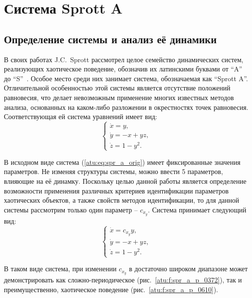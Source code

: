 
\FloatBarrier
\section{Система Sprott A}


\subsection{Определение системы и анализ её динамики} %

В своих работах J.C.~Sprott рассмотрел целое семейство динамических
систем, реализующих хаотическое поведение, обозначив их латинскими буквами
от ``A'' до ``S''~\cite{sprott_212,sprott_strange_attr}. Особое место среди них
занимает система, обозначаемая как ``Sprott A''. Отличительной особенностью
этой системы является отсутствие положений равновесия, что делает
невозможным применение многих известных методов анализа, основанных на
каком-либо разложении в окрестностях точек равновесия. Соответствующая ей
система уравнений имеет вид:
%
\begin{equation}
  \begin{cases}
    \dot{x} =  y, \\
    \dot{y} = -x + yz, \\
    \dot{z} =  1 - y^2.
  \end{cases}
  \label{atu:eq:spr_a_orig}
\end{equation}


В исходном виде система (\ref{atu:eq:spr_a_orig}) имеет фиксированные значения параметров.
Не изменяя структуры системы, можно ввести 5 параметров, влияющие на её динамку.
Поскольку целью данной работы является определение возможности применения
различных критериев идентификации параметров
хаотических объектов, а также свойств методов идентификации, то для данной системы
рассмотрим только один параметр -- $c_{x_y} $. Система принимает следующий вид:
%
\begin{equation}
  \begin{cases}
    \dot{x} =  c_{x_y} y, \\
    \dot{y} = -x + yz, \\
    \dot{z} =  1 - y^2.
  \end{cases}
  \label{atu:eq:spr_a}
\end{equation}

В таком виде система, при изменении $c_{x_y} $
в достаточно широком диапазоне может демонстрировать как
сложно-периодическое (рис.~\ref{atu:f:spr_a_p_0372}), так и преимущественно, хаотическое
поведение (рис.~\ref{atu:f:spr_a_p_0610}).

